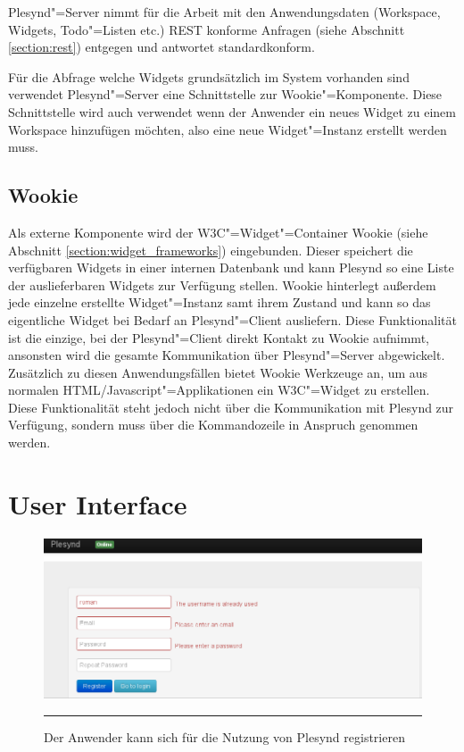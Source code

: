 Plesynd"=Server nimmt für die Arbeit mit den Anwendungsdaten (Workspace, Widgets, Todo"=Listen etc.) REST konforme Anfragen (siehe Abschnitt \ref{section:rest}) entgegen und antwortet standardkonform.

Für die Abfrage welche Widgets grundsätzlich im System vorhanden sind verwendet Plesynd"=Server eine Schnittstelle zur Wookie"=Komponente. Diese Schnittstelle wird auch verwendet wenn der Anwender ein neues Widget zu einem Workspace hinzufügen möchten, also eine neue Widget"=Instanz erstellt werden muss.

\subsection{Wookie}\label{section:loesung_wookie}
Als externe Komponente wird der W3C"=Widget"=Container Wookie (siehe Abschnitt \ref{section:widget_frameworks}) eingebunden. Dieser speichert die verfügbaren Widgets in einer internen Datenbank und kann Plesynd so eine Liste der auslieferbaren Widgets zur Verfügung stellen. Wookie hinterlegt außerdem jede einzelne erstellte Widget"=Instanz samt ihrem Zustand und kann so das eigentliche Widget bei Bedarf an Plesynd"=Client ausliefern. Diese Funktionalität ist die einzige, bei der Plesynd"=Client direkt Kontakt zu Wookie aufnimmt, ansonsten wird die gesamte Kommunikation über Plesynd"=Server abgewickelt. Zusätzlich zu diesen Anwendungsfällen bietet Wookie Werkzeuge an, um aus normalen HTML/Javascript"=Applikationen ein W3C"=Widget zu erstellen. Diese Funktionalität steht jedoch nicht über die Kommunikation mit Plesynd zur Verfügung, sondern muss über die Kommandozeile in Anspruch genommen werden.

\section{User Interface}\label{section:user_interface}
\begin{figure}
  \centering
  \includegraphics[width=\textwidth,height=\textheight,keepaspectratio]{./Figures/plesynd_register.png}
    \rule{35em}{0.5pt}
  \caption[Plesynd User"=Interface: Registrieren]{Der Anwender kann sich für die Nutzung von Plesynd registrieren}
  \label{fig:plesynd_register}
\end{figure}

